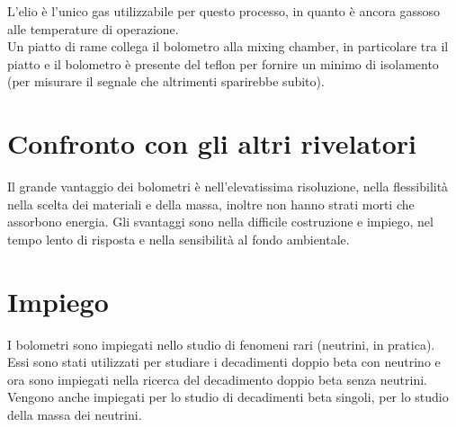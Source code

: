 L'elio \`e l'unico gas utilizzabile per questo processo, in quanto \`e ancora gassoso alle temperature di operazione.\\
Un piatto di rame collega il bolometro alla mixing chamber, in particolare tra il piatto e il bolometro \`e presente del teflon per fornire un
minimo di isolamento (per misurare il segnale che altrimenti sparirebbe subito).
\section{Confronto con gli altri rivelatori}
Il grande vantaggio dei bolometri \`e nell'elevatissima risoluzione, nella flessibilit\`a nella scelta dei materiali e della massa, inoltre non hanno
strati morti che assorbono energia.
Gli svantaggi sono nella difficile costruzione e impiego, nel tempo lento di risposta e nella sensibilit\`a al fondo ambientale.
\section{Impiego}
I bolometri sono impiegati nello studio di fenomeni rari (neutrini, in pratica). 
Essi sono stati utilizzati per studiare i decadimenti doppio beta con neutrino e ora sono impiegati nella ricerca del decadimento doppio beta senza neutrini.
Vengono anche impiegati per lo studio di decadimenti beta singoli, per lo studio della massa dei neutrini.
